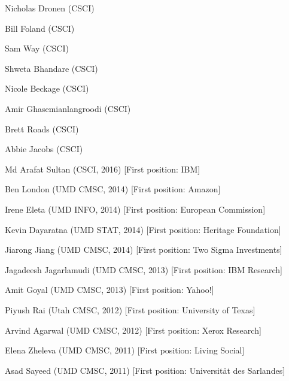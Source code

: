 \documentclass[10pt,a4paper]{article} %
\begin{document}
{{\begin{enumerate*}
\item Nicholas Dronen (CSCI)
\item Bill Foland (CSCI)
\item Sam Way (CSCI)
\item Shweta Bhandare (CSCI)
\item Nicole Beckage (CSCI)
\item Amir Ghasemianlangroodi (CSCI)
\item Brett Roads (CSCI)
\item Abbie Jacobs (CSCI)
\item Md Arafat Sultan (CSCI, 2016) [First position: IBM]
\item Ben London (UMD CMSC, 2014) [First position: Amazon]
\item Irene Eleta (UMD INFO, 2014) [First position: European Commission]
\item Kevin Dayaratna (UMD STAT, 2014) [First position: Heritage Foundation]
\item Jiarong Jiang (UMD CMSC, 2014) [First position: Two Sigma Investments]
\item Jagadeesh Jagarlamudi (UMD CMSC, 2013) [First position: IBM Research]
\item Amit Goyal (UMD CMSC, 2013) [First position: Yahoo!]
\item Piyush Rai (Utah CMSC, 2012) [First position: University of Texas]
\item Arvind Agarwal (UMD CMSC, 2012) [First position: Xerox Research]
\item Elena Zheleva (UMD CMSC, 2011) [First position: Living Social]
\item Asad Sayeed (UMD CMSC, 2011) [First position: Universit\"at des Sarlandes]
\end{enumerate*}
}
}



\end{document}
